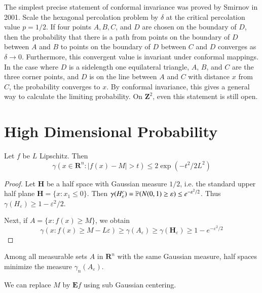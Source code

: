 The simplest precise statement of conformal invariance was proved by Smirnov in 2001. Scale the hexagonal percolation problem by $\delta$ at the critical percolation value $p = 1/2$. If four points $A,B,C$, and $D$ are chosen on the boundary of $D$, then the probability that there is a path from points on the boundary of $D$ between $A$ and $B$ to points on the boundary of $D$ between $C$ and $D$ converges as $\delta \to 0$. Furthermore, this convergent value is invariant under conformal mappings. In the case where $D$ is a sidelength one equilateral triangle, $A$, $B$, and $C$ are the three corner points, and $D$ is on the line between $A$ and $C$ with distance $x$ from $C$, the probability converges to $x$. By conformal invariance, this gives a general way to calculate the limiting probability. On $\mathbf{Z}^2$, even this statement is still open.






\chapter{High Dimensional Probability}

\begin{theorem}
    Let $f$ be $L$ Lipschitz. Then
    \[ \gamma(x \in \mathbf{R}^n: |f(x) - M| > t) \leq 2 \exp(-t^2/2L^2) \]
\end{theorem}
\begin{proof}
    Let $\mathbf{H}$ be a half space with Gaussian measure $1/2$, i.e. the standard upper half plane $\mathbf{H} = \{ x: x_1 \leq 0 \}$. Then $\gamma(H_\varepsilon^c) = \operatorname{\mathbb{P}}(N(0,1) \geq \varepsilon) \leq e^{-\varepsilon^2/2}$. Thus $\gamma(H_\varepsilon) \geq 1 - \varepsilon^2/2$.

    Next, if $A = \{ x: f(x) \geq M \}$, we obtain
    \[ \gamma(x: f(x) \geq M - L\varepsilon) \geq \gamma(A_\varepsilon) \geq \gamma(\mathbf{H}_\varepsilon) \geq 1 - e^{-\varepsilon^2/2} \]
\end{proof}

\begin{theorem}
    Among all measurable sets $A$ in $\mathbf{R}^n$ with the same Gaussian measure, half spaces minimize the measure $\gamma_n(A_\varepsilon)$.
\end{theorem}

\begin{remark}
    We can replace $M$ by $\mathbf{E}f$ using sub Gaussian centering.
\end{remark}

